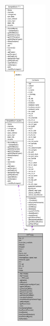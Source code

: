 \begin{figure}[H]
\begin{center}
\leavevmode
\includegraphics[height=400pt]{class_h_w_thread__coll__graph}
\end{center}
\end{figure}
